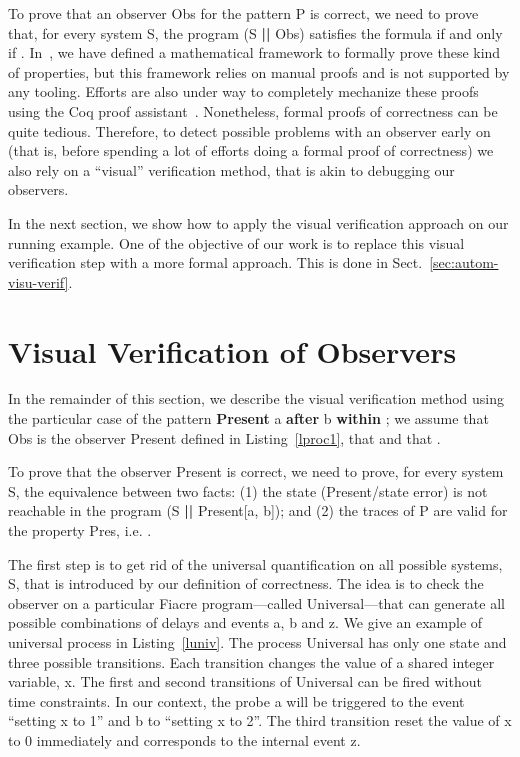 \documentclass[a4paper]{scrartcl}
\def\code#1{\textsf{\small\bfseries #1}}
\def\vars#1{\textsf{\small #1}}
\begin{document}
To prove that an observer \vars{Obs} for the pattern \vars{P} is
correct, we need to prove that, for every system \vars{S}, the program
(\vars{S} \code{||} \vars{Obs}) satisfies the formula  if
and only if . In~\cite{FRP11}, we have defined a mathematical
framework to formally prove these kind of properties, but this
framework relies on manual proofs and is not supported by any
tooling. Efforts are also under way to completely mechanize these
proofs using the Coq proof assistant~\cite{garnacho12}. Nonetheless,
formal proofs of correctness can be quite tedious. Therefore, to
detect possible problems with an observer early on (that is, before
spending a lot of efforts doing a formal proof of correctness) we also
rely on a ``visual'' verification method, that is akin to debugging
our observers.

In the next section, we show how to apply the visual verification
approach on our running example. One of the objective of our work is
to replace this visual verification step with a more formal
approach. This is done in Sect.~\ref{sec:autom-visu-verif}.

\section{Visual Verification of Observers}
\label{sec 4:patterns verification}

In the remainder of this section, we describe the visual verification
method using the particular case of the pattern \code{Present}
\vars{a} \code{after} \vars{b} \code{within} ; we assume that
\vars{Obs} is the observer \vars{Present} defined in
Listing~\ref{lproc1}, that  and that . 

To prove that the observer \vars{Present} is correct, we need to
prove, for every system \vars{S}, the equivalence between two facts:
(1) the state \vars{(Present/state error)} is not reachable in the
program (\vars{S} \code{||} \vars{Present[a, b]}); and (2) the traces
of \vars{P} are valid for the property Pres, i.e. .

The first step is to get rid of the universal quantification on all
possible systems, \vars{S}, that is introduced by our definition of
correctness. The idea is to check the observer on a particular Fiacre
program---called \vars{Universal}---that can generate all possible
combinations of delays and events \vars{a}, \vars{b} and \vars{z}.  We
give an example of universal process in Listing~\ref{luniv}.
The process \vars{Universal} has only one state and three possible
transitions. Each transition changes the value of a shared integer
variable, \vars{x}. The first and second transitions of
\vars{Universal} can be fired without time constraints. In our
context, the probe \vars{a} will be triggered to the event ``setting
\vars{x} to 1'' and \vars{b} to ``setting \vars{x} to 2''. The third
transition reset the value of \vars{x} to 0 immediately and
corresponds to the internal event \vars{z}.
\end{document}
